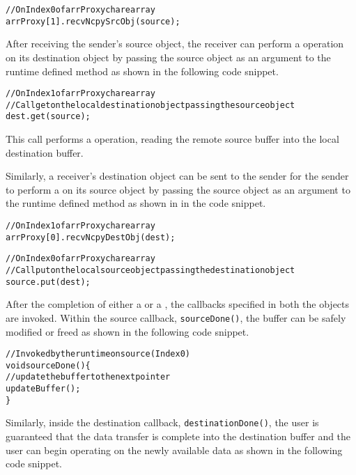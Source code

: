 \begin{alltt}
// On Index 0 of arrProxy chare array
arrProxy[1].recvNcpySrcObj(source);
\end{alltt}

After receiving the sender's source  object, the receiver can perform a 
operation on its destination  object by passing the source object as
an argument to the runtime defined  method as shown in the following code snippet.

\begin{alltt}
// On Index 1 of arrProxy chare array
// Call get on the local destination object passing the source object
dest.get(source);
\end{alltt}

This call performs a  operation, reading the remote source buffer into the local
destination buffer.

Similarly, a receiver's destination  object can be sent to the sender for
the sender to perform a  on its source object by passing the source 
object as an argument to the runtime defined  method as shown in in the code
snippet.

\begin{alltt}
// On Index 1 of arrProxy chare array
arrProxy[0].recvNcpyDestObj(dest);
\end{alltt}

\begin{alltt}
// On Index 0 of arrProxy chare array
// Call put on the local source object passing the destination object
source.put(dest);
\end{alltt}

After the completion of either a  or a , the callbacks specified
in both the objects are invoked. Within the
 source callback, \texttt{sourceDone()}, the buffer can be safely modified or freed
as shown in the following code snippet.

\begin{alltt}
// Invoked by the runtime on source (Index 0)
void sourceDone() \{
    // update the buffer to the next pointer
    updateBuffer();
\}
\end{alltt}

Similarly, inside the  destination callback, \texttt{destinationDone()}, the user
is guaranteed that the data transfer is complete into the destination buffer and the user
can begin operating on the newly available data as shown in the following code snippet.


